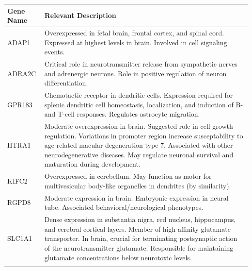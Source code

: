 \documentclass[11pt, a4paper, oneside]{article}
\begin{document}
\begin{tabular}{p{2.5cm}p{15.5cm}}
 \textbf{Gene Name} & \textbf{Relevant Description} \\
 \hline
 ADAP1 & Overexpressed in fetal brain, frontal cortex, and spinal cord. Expressed at highest levels in brain. Involved in cell signaling events. \\
 \hline
 ADRA2C & Critical role in neurotransmitter release from sympathetic nerves and adrenergic neurons. Role in positive regulation of neuron differentiation. \\
 \hline
 GPR183 & Chemotactic receptor in dendritic cells. Expression required for splenic dendritic cell homeostasis, localization, and induction of B- and T-cell responses. Regulates astrocyte migration. \\
 \hline
 HTRA1 & Moderate overexpression in brain. Suggested role in cell growth regulation. Variations in promoter region increase susceptability to age-related macular degeneration type 7. Associated with other neurodegenerative diseases. May regulate neuronal survival and maturation during development. \\
 \hline
 KIFC2 & Overexpressed in cerebellum. May function as motor for multivesicular body-like organelles in dendrites (by similarity). \\
 \hline
 RGPD8 & Moderate expression in brain. Embryonic expression in neural tube. Associated behavioral/neurological phenotypes. \\
 \hline
 SLC1A1 & Dense expression in substantia nigra, red nucleus, hippocampus, and cerebral cortical layers. Member of high-affinity glutamate transporter. In brain, crucial for terminating postsynaptic action of the neurotransmitter glutamate. Responsible for maintaining glutamate concentrations below neurotoxic levels. \\
 \label{tab:targets}
\end{tabular}
\newline
\end{document}
